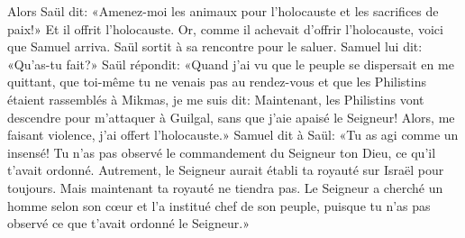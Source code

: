 Alors Saül dit: «Amenez-moi les animaux pour l’holocauste et les sacrifices de paix!»
	Et il offrit l’holocauste.
Or, comme il achevait d’offrir l’holocauste, voici que Samuel arriva.
	Saül sortit à sa rencontre pour le saluer.
Samuel lui dit:
	«Qu’as-tu fait?»
Saül répondit: «Quand j’ai vu que le peuple se dispersait en me quittant,
	que toi-même tu ne venais pas au rendez-vous
	et que les Philistins étaient rassemblés à Mikmas,
	je me suis dit: Maintenant, les Philistins vont descendre pour m’attaquer à Guilgal,
	sans que j’aie apaisé le Seigneur!
	Alors, me faisant violence, j’ai offert l’holocauste.»
Samuel dit à Saül: «Tu as agi comme un insensé!
	Tu n’as pas observé le commandement du Seigneur ton Dieu, ce qu’il t’avait ordonné.
Autrement, le Seigneur aurait établi ta royauté sur Israël pour toujours.
	Mais maintenant ta royauté ne tiendra pas.
Le Seigneur a cherché un homme selon son cœur et l’a institué chef de son peuple,
	puisque tu n’as pas observé ce que t’avait ordonné le Seigneur.»
